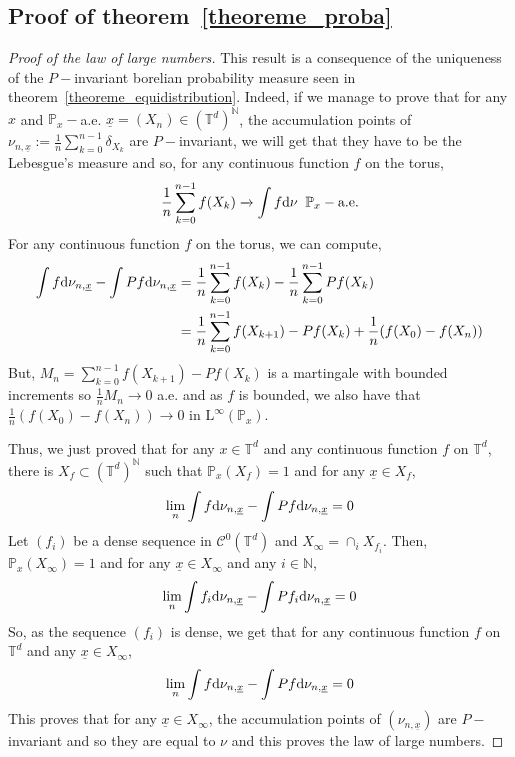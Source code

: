 \documentclass[11pt]{amsart}
\theoremstyle{definition}
\theoremstyle{remark}
\numberwithin{equation}{section}
\begin{document}
\subsection{Proof of theorem~\ref{theoreme_proba}} \label{soussection:demonstration_theoreme_proba}

\begin{proof}[Proof of the law of large numbers]
This result is a consequence of the uniqueness of the $P-$invariant borelian probability measure seen in theorem~\ref{theoreme_equidistribution}. Indeed, if we manage to prove that for any $x$ and ${\mathbb P}_x-$a.e. $\underline{x}=(X_n) \in ({\mathbb T}^d)^{\mathbb N}$, the accumulation points of $\nu_{n,{\underline{x}}}:=\frac 1 n \sum_{k=0}^{n-1} \delta_{X_k}$ are $P-$invariant, we will get that they have to be the Lebesgue's measure and so, for any continuous function $f$ on the torus,
\[
\frac 1 n \sum_{k=0}^{n-1} f(X_k) \xrightarrow\, \int f{{\rm d}}\nu \;\;{\mathbb P}_x-\text{a.e.}
\]
For any continuous function $f$ on the torus, we can compute,
\begin{align*}
\int f{{\rm d}}\nu_{n,{\underline{x}}} - \int Pf{{\rm d}}\nu_{n,{\underline{x}}} &= \frac 1 n \sum_{k=0}^{n-1} f(X_k) - \frac 1 n \sum_{k=0}^{n-1} Pf(X_k) \\
&= \frac 1 n \sum_{k=0}^{n-1} f(X_{k+1}) - Pf(X_k)  + \frac 1n (f(X_0) - f(X_n))
\end{align*}
But, $M_n = \sum_{k=0}^{n-1} f(X_{k+1}) - Pf(X_k)$ is a martingale with bounded increments so $\frac 1 n M_n \xrightarrow\, 0$ a.e. and as $f$ is bounded, we also have that $\frac 1 n (f(X_0) - f(X_n)) \xrightarrow\, 0$ in $\mathrm{L}^\infty({\mathbb P}_x)$.

Thus, we just proved that for any $x\in {\mathbb T}^d$ and any continuous function $f$ on ${\mathbb T}^d$, there is $X_f \subset ({\mathbb T}^d)^{\mathbb N}$ such that ${\mathbb P}_x(X_f) = 1$ and for any $\underline{x}\in X_f$,
\[
\lim_n \int f{{\rm d}}\nu_{n,{\underline{x}}} - \int Pf{{\rm d}}\nu_{n,{\underline{x}}}=0
\]
Let $(f_i)$ be a dense sequence in $\mathcal{C}^0({\mathbb T}^d)$ and $X_\infty = \cap_i X_{f_i}$. Then, ${\mathbb P}_x(X_\infty)=1$ and for any $\underline{x}\in X_\infty$ and any $i\in {\mathbb N}$,
\[
\lim_n \int f_i{{\rm d}}\nu_{n,{\underline{x}}} - \int Pf_i{{\rm d}}\nu_{n,{\underline{x}}}=0
\]
So, as the sequence $(f_i)$ is dense, we get that for any continuous function $f$ on ${\mathbb T}^d$ and any $\underline{x} \in X_\infty$,
\[
\lim_n \int f{{\rm d}}\nu_{n,{\underline{x}}} - \int Pf{{\rm d}}\nu_{n,{\underline{x}}} = 0
\]
This proves that for any $\underline{x}\in X_\infty$, the accumulation points of $(\nu_{n,{\underline{x}}})$ are $P-$invariant and so they are equal to $\nu$ and this proves the law of large numbers.
\end{proof}
\end{document}

